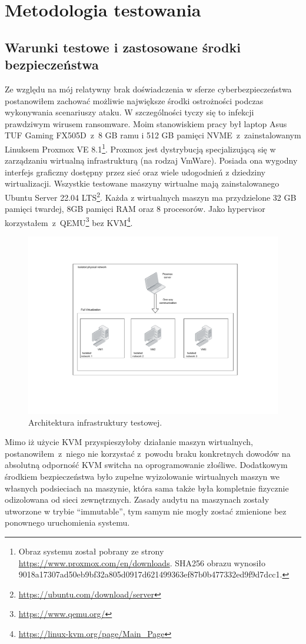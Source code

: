 \section{Metodologia testowania}
\subsection{Warunki testowe i zastosowane środki bezpieczeństwa}
Ze względu na mój relatywny brak doświadczenia w sferze cyberbezpieczeństwa postanowiłem 
zachować możliwie największe środki ostrożności podczas wykonywania scenariuszy ataku. W szczególności tyczy się to infekcji prawdziwym wirusem ransomware.\newline
Moim stanowiskiem pracy był laptop Asus TUF Gaming FX505D~z~8 GB ramu i 512 GB pamięci NVME~z~zainstalowanym Linuksem Proxmox VE 8.1\footnote{Obraz systemu został pobrany ze strony \url{https://www.proxmox.com/en/downloads}. SHA256 obrazu wynosiło 9018a17307ad50eb9bf32a805d0917d621499363ef87b0b477332ed9f9d7dcc1.}. Proxmox jest dystrybucją specjalizującą się w zarządzaniu wirtualną infrastrukturą (na rodzaj VmWare). Posiada ona wygodny interfejs graficzny dostępny przez sieć oraz wiele udogodnień z dziedziny wirtualizacji.
\newline
Wszystkie testowane maszyny wirtualne mają zainstalowanego Ubuntu Server 22.04 LTS\footnote{\url{https://ubuntu.com/download/server}}. Każda z wirtualnych maszyn ma przydzielone 32 GB pamięci twardej, 8GB pamięci RAM oraz 8 procesorów. Jako hypervisor korzystałem~z~QEMU\footnote{\url{https://www.qemu.org/}} bez KVM\footnote{\url{https://linux-kvm.org/page/Main_Page}}.
\begin{figure}[H]
    \centering
    \includegraphics[width=0.45\linewidth]{rysunki/test.drawio.pdf}
    \caption{Architektura infrastruktury testowej.}
    \label{fig:enter-label}
\end{figure}
Mimo iż użycie KVM przyspieszyłoby działanie maszyn wirtualnych, postanowiłem~z~niego nie korzystać z~powodu braku konkretnych dowodów na absolutną odporność KVM switcha na oprogramowanie złośliwe. Dodatkowym środkiem bezpieczeństwa było zupełne wyizolowanie wirtualnych maszyn we własnych podsieciach na maszynie, która sama także była kompletnie fizycznie odizolowana od sieci zewnętrznych. Zasady audytu na maszynach zostały utworzone w trybie \foreignquote{english}{immutable}, tym samym nie mogły zostać zmienione bez ponownego uruchomienia systemu.

